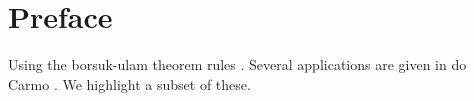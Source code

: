 \section{Preface}

Using the borsuk-ulam theorem rules \cite{jm08}.
Several applications are given in do Carmo \cite{doc76}.
We highlight a subset of these.









